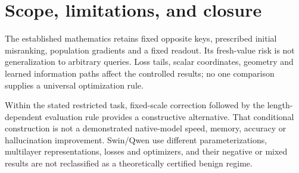 \documentclass[10pt,a4paper]{article}
\begin{document}
\section{Scope, limitations, and closure}\label{sec:discussion}
The established mathematics retains fixed opposite keys, prescribed initial misranking, population gradients and a fixed readout. Its fresh-value risk is not generalization to arbitrary queries. Loss tails, scalar coordinates, geometry and learned information paths affect the controlled results; no one comparison supplies a universal optimization rule.

Within the stated restricted task, fixed-scale correction followed by the length-dependent evaluation rule provides a constructive alternative. That conditional construction is not a demonstrated native-model speed, memory, accuracy or hallucination improvement. Swin/Qwen use different parameterizations, multilayer representations, losses and optimizers, and their negative or mixed results are not reclassified as a theoretically certified benign regime.
\end{document}

